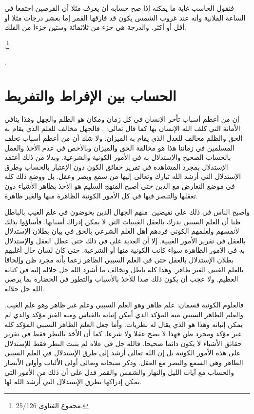 فنقول الحاسب غاية ما يمكنه إذا صح حسابه أن يعرف مثلا أن القرصين اجتمعا في الساعة الفلانية وأنه عند غروب الشمس يكون قد فارقها القمر إما بعشر درجات مثلا أو أقل أو أكثر. والدرجة هي جزء من ثلاثمائة وستين جزءا من الفلك.

\href{https://shamela.ws/book/7289/12579#p2}{\faExternalLink} \cite{ibnTaimia_Majmoo}.\footnote{مجموع الفتاوى 25/126.} 


\cite{shuhur_ahmidShakir}. 

\section{الحساب بين الإفراط والتفريط}

إن من أعظم أسباب تأخر الإنسان في كل زمان ومكان هو الظلم والجهل وهذا ينافي الأمانة التي كلف الله الإنسان بها كما قال تعالى: \quranayah*[33][72] {\footnotesize (\surahname*[33])}. فالجهل مخالف للعلم الذي يقام به الحق والظلم مخالف للعدل الذي يقام به الميزان. ولا شك أن من أعظم أسباب تخلف المسلمين في زماننا هذا هو مخالفة الحق والميزان وبالأخص في عدم الأخذ والعمل بالحساب الصحيح والإستدلال به في الأمور الكونية والشرعية. وبدلا من ذلك أعتمد الإستدلال بمجرد المشاهدة في تقرير حقائق الكون دون الإعتبار بالحساب وطرق الإستدلال التي أرشد الله تبارك وتعالى إليها من سمع وبصر وعقل. بل ووضع ذلك كله في موضع التعارض مع الدين حتى أصبح المنهج السليم هو الأخذ بظاهر الأشياء دون تعقلها والتبصر فيها في كل الأمور الكونية الظاهرة منها والغير ظاهرة.  

وأصبح الناس في ذلك على نقيضين. منهم الجهال الذين يخوضون في علم الغيب بالباطل ظنا أن العلم السببي يدرك بالعقل الغيبيات التي لا يمكن إدراك أسبابها. فأساؤوا بذلك لأنفسهم ولعلمهم الكوني فردهم أهل العلم الشرعي بالحق في بيان بطلان الإستدلال بالعقل في تقرير الأمور الغيبية. إلا أن العديد غلى في ذلك حتى عطل العقل والإستدلال به في الأمور الظاهرة سواء كانت الكونية منها أو الشرعية. حتى كان لسان حال أغلبهم بطلان الإستدلال بالعقل حتى في العلم السببي الظاهر زعما بأنه مجرد ظن وإلحاقا بالعلم الغيبي الغير ظاهر. وهذا كله باطل ويخالف ما أشرد الله جل جلاله إليه في كتابه العظيم. ولا عجب أن يكون ذلك صدا للأخذ بالأسباب والتطور في الحضارة بما يرضي الله جل جلاله. 

فالعلوم الكونية قسمان: علم ظاهر وهو العلم السببي وعلم غير ظاهر وهو علم الغيب. والعلم الظاهر السببي منه المؤكد الذي أمكن إثباته بالقياس ومنه الغير مؤكد والذي لم يمكن إثباته وهذا هو الذي يقال له نظريات. وأما جعل العلم الظاهر السببي المؤكد كله غير مؤكد ومجرد ظن فهذا لا يصح عقلا ولا شرعا. كما أن الأخذ بالنظر فقط في تقرير حقائق الأشياء لا يكون دائما صحيحا. فالله جل في علاه لم يثبت النظر فقط للإستدلال على هذه الأمور الكونية بل إن الله تعالى أرشد إلى طرق الإستدلال في العلم السببي الظاهر وهي السمع والبصر مع العقل. وذكر سبحانه وتعالى أولى الألباب وأولى الأبصار والحساب مع آيات الليل والنهار والشمس والقمر فدل على أن ذلك من الأمور التي يمكن إدراكها بطرق الإستدلال التي أرشد الله لها.

